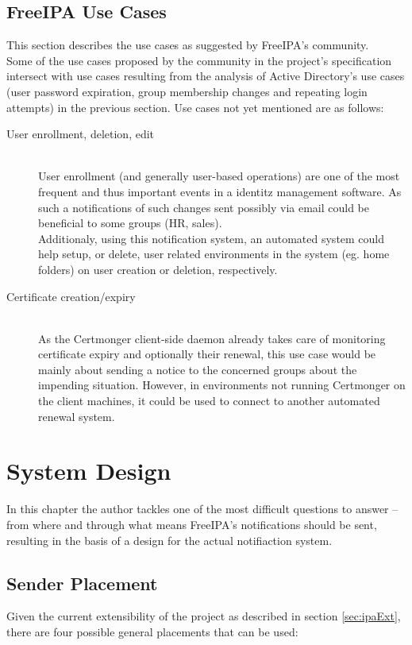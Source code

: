 \section{FreeIPA Use Cases}
This section describes the use cases as suggested by FreeIPA's community. \\
Some of the use cases proposed by the community in the project's specification intersect with use cases resulting from the analysis of Active Directory's use cases (user password expiration, group membership changes and repeating login attempts) in the previous section.
Use cases not yet mentioned are as follows:
\begin{description}
    \item[User enrollment, deletion, edit]\hfill \\
        User enrollment (and generally user-based operations) are one of the most frequent and thus important events in a identitz management software.
        As such a notifications of such changes sent possibly via email could be beneficial to some groups (HR, sales). \\
        Additionaly, using this notification system, an automated system could help setup, or delete, user related environments in the system (eg. home folders) on user creation or deletion, respectively.
    \item[Certificate creation/expiry]\hfill \\
        As the Certmonger client-side daemon already takes care of monitoring certificate expiry and optionally their renewal, this use case would be mainly about sending a notice to the concerned groups
        about the impending situation. However, in environments not running Certmonger on the client machines, it could be used to connect to another automated renewal system.
\end{description}

\chapter{System Design}
\label{chp:appDesign}
In this chapter the author tackles one of the most difficult questions to answer -- from where and through what means FreeIPA's notifications should be sent, resulting in the basis of a design for the actual notifiaction system.
\section{Sender Placement}
Given the current extensibility of the project as described in section \ref{sec:ipaExt},
there are four possible general placements that can be used:

